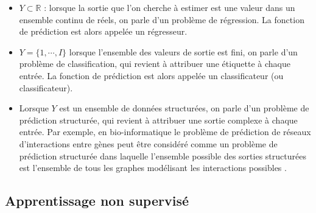 \documentclass[12pt, french]{report}
\begin{document}
\begin{itemize} 
\item $Y \subset \mathbb{R}$  : lorsque la sortie que l'on cherche à estimer est une valeur dans un ensemble continu de réels, on parle d'un problème de régression. La fonction de prédiction est alors appelée un régresseur.
\item $Y = \{ 1, \cdots, I \} $ lorsque l'ensemble des valeurs de sortie est fini, on parle d'un problème de classification, qui revient à attribuer une étiquette à chaque entrée. La fonction de prédiction est alors appelée un classificateur (ou classificateur).
\item Lorsque  $Y$ est un ensemble de données structurées, on parle d'un problème de prédiction structurée, qui revient à attribuer une sortie complexe à chaque entrée. Par exemple, en bio-informatique le problème de prédiction de réseaux d’interactions entre gènes peut être considéré comme un problème de prédiction structurée dans laquelle l'ensemble possible des sorties structurées est l'ensemble de tous les graphes modélisant les interactions possibles \cite{key14}.
\end{itemize}





\subsection{Apprentissage non supervisé}
 
\end{document}
